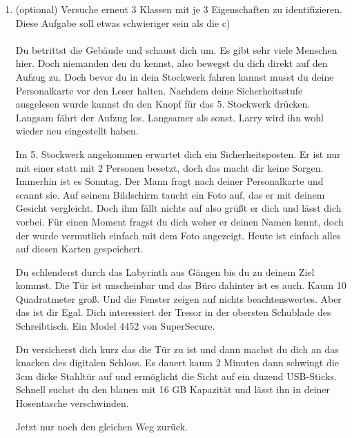 \begin{enumerate}
    \item (optional) Versuche erneut 3 Klassen mit je 3 Eigenschaften  zu identifizieren. Diese Aufgabe soll etwas schwieriger sein als die c)
    \paragraph{}
    Du betrittst die Gebäude und schaust dich um. Es gibt sehr viele Menschen hier. Doch niemanden den du kennst, also bewegst du dich direkt auf den Aufzug zu. Doch bevor du in dein Stockwerk fahren kannst musst du deine Personalkarte vor den Leser halten. Nachdem deine Sicherheitsstufe ausgelesen wurde kannst du den Knopf für das 5. Stockwerk drücken. Langsam fährt der Aufzug los. Langsamer als sonst. Larry wird ihn wohl wieder neu eingestellt haben.

    Im 5. Stockwerk angekommen erwartet dich ein Sicherheitsposten. Er ist nur mit einer statt mit 2 Personen besetzt, doch das macht dir keine Sorgen. Immerhin ist es Sonntag. Der Mann fragt nach deiner Personalkarte und scannt sie. Auf seinem Bildschirm taucht ein Foto auf, das er mit deinem Gesicht vergleicht. Doch ihm fällt nichts auf also grüßt er dich und lässt dich vorbei. Für einen Moment fragst du dich woher er deinen Namen kennt, doch der wurde vermutlich einfach mit dem Foto angezeigt. Heute ist einfach alles auf diesen Karten gespeichert.

    Du schlenderst durch das Labyrinth aus Gängen bis du zu deinem Ziel kommst. Die Tür ist unscheinbar und das Büro dahinter ist es auch. Kaum 10 Quadratmeter groß. Und die Fenster zeigen auf nichts beachtenswertes. Aber das ist dir Egal. Dich interessiert der Tresor in der obersten Schublade des Schreibtisch. Ein Model 4452 von SuperSecure.

    Du versicherst dich kurz das die Tür zu ist und dann machst du dich an das knacken des digitalen Schloss. Es dauert kaum 2 Minuten dann schwingt die 3cm dicke Stahltür auf und ermöglicht die Sicht auf ein duzend USB-Sticks. Schnell suchst du den blauen mit 16 GB Kapazität und lässt ihn in deiner Hosentasche verschwinden.

    Jetzt nur noch den gleichen Weg zurück.
\end{enumerate}
